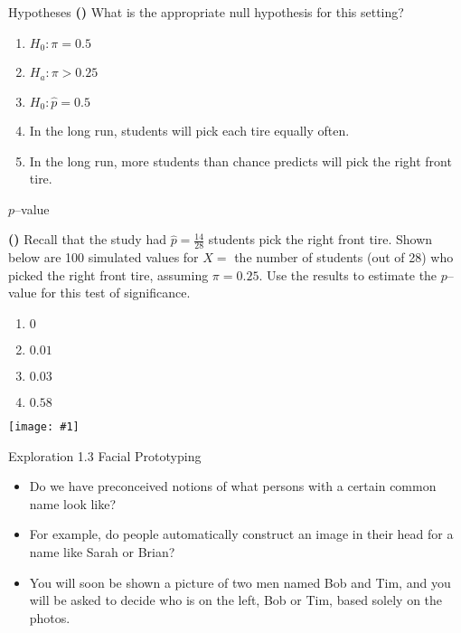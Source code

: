 \documentclass[13pt]{beamer}
\newcounter{count}
\newcommand{\question}{ \textbf{(\decimal{count})} \stepcounter{count}}
\newcommand{\pic}[2]{\hfill\texttt{[image: \#1]}\hspace*{\fill}}
\newenvironment{stepitemize}{\begin{itemize}[<+->]}{\end{itemize} }
\begin{document}
\begin{frame}{Hypotheses}
\question What is the appropriate null hypothesis for this setting?
\begin{enumerate}[A]
   \item $H_0:\pi=0.5$
   \item $H_a:\pi>0.25$
   \item $H_0:\hat{p}=0.5$
   \item In the long run, students will pick each tire equally often.%
   \item In the long run, more students than chance predicts will pick the right front tire. 
\end{enumerate}
\end{frame}

\begin{frame}{$p$--value}

\question Recall that the study had $\hat{p}=\frac{14}{28}$ students pick the right front tire. Shown below are 100 simulated values for $X=$ the number of students (out of 28) who picked the right front tire, assuming $\pi=0.25$. Use the results to estimate the $p$--value for this test of significance.

\begin{multicols}{2}

\begin{enumerate}[A]
   \item $0$
   \item $0.01$%
   \item $0.03$
   \item $0.58$
\end{enumerate}

\pic{tiresimulation.PNG}{.9}
\end{multicols}

\end{frame}

\begin{frame}{Exploration 1.3 Facial Prototyping}

\begin{stepitemize}
   \item Do we have preconceived notions of what persons with a certain common name look like? 
   \item For example, do people automatically construct an image in their head for a name like Sarah or Brian?
   \item You will soon be shown a picture of two men named Bob and Tim, and you will be asked to decide who is on the left, Bob or Tim, based solely on the photos.
\end{stepitemize}

\end{frame}
\end{document}
